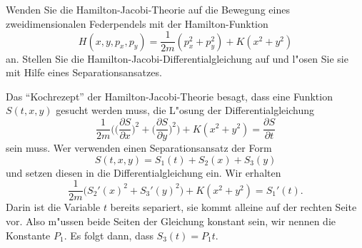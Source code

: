 Wenden Sie die Hamilton-Jacobi-Theorie auf die Bewegung eines
zweidimensionalen Federpendels mit der Hamilton-Funktion 
\[
H(x,y,p_x,p_y)=\frac1{2m}(p_x^2+p_y^2)+K(x^2 + y^2)
\]
an. Stellen Sie die Hamilton-Jacobi-Differentialgleichung auf
und l"osen Sie sie mit Hilfe eines Separationsansatzes.

\begin{loesung}
Das ``Kochrezept'' der Hamilton-Jacobi-Theorie besagt, dass eine
Funktion $S(t, x, y)$ gesucht werden muss, die L"osung
der Differentialgleichung
\[
\frac1{2m}\biggl(
\biggl(\frac{\partial S}{\partial x}\biggr)^2
+
\biggl(\frac{\partial S}{\partial y}\biggr)^2
\biggr)+K(x^2+y^2)=\frac{\partial S}{\partial t}
\]
sein muss. Wer verwenden einen Separationsansatz der Form
\[
S(t,x,y)=S_1(t)+S_2(x)+S_3(y)
\]
und setzen diesen in die Differentialgleichung ein.
Wir erhalten
\[
\frac1{2m}\bigl( S_2'(x)^2+S_3'(y)^2 \bigr)+K(x^2+y^2)=S_1'(t).
\]
Darin ist die Variable $t$ bereits separiert, sie kommt alleine auf
der rechten Seite vor. Also m"ussen beide Seiten der Gleichung konstant
sein, wir nennen die Konstante $P_1$. Es folgt dann, dass 
$S_3(t)=P_1t.$


\end{loesung}
